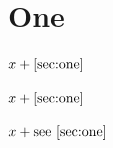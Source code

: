 \documentclass{article}
\begin{document}
\section{One}\label{sec:one}

\( x + \ref{sec:one} \)

\( x + \pageref{sec:one} \)

\( x + \text{see \ref{sec:one}} \)
\end{document}
